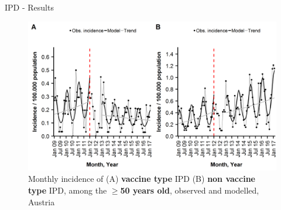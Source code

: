 \documentclass[table]{beamer}\usepackage[]{graphicx}\usepackage[]{color}
\begin{document}
\begin{frame}[fragile]{IPD - Results}
\begin{center}
\begin{figure}
  \centering
  \caption{Monthly incidence of (A) \textbf{vaccine type} IPD (B) \textbf{non vaccine type} IPD, among the \textbf{$\ge$50 years old}, observed and modelled, Austria}
  \includegraphics[width=\textwidth,height=0.5\textheight,keepaspectratio]{richter2019_Fig3.png}
\end{figure}
\end{center}
\vfill
{\scriptsize \cite{richter2019}}
\end{frame}
\end{document}
